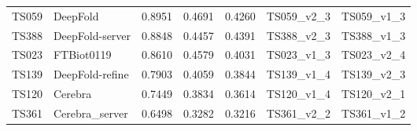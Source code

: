 \begin{table}[ht]
{\begin{tabular}{llrrrll}
TS059 & DeepFold & 0.8951 & 0.4691 & 0.4260 & TS059\_v2\_3 & TS059\_v1\_3 \\ 
TS388 & DeepFold-server & 0.8848 & 0.4457 & 0.4391 & TS388\_v2\_3 & TS388\_v1\_3 \\ 
TS023 & FTBiot0119 & 0.8610 & 0.4579 & 0.4031 & TS023\_v1\_3 & TS023\_v2\_4 \\ 
TS139 & DeepFold-refine & 0.7903 & 0.4059 & 0.3844 & TS139\_v1\_4 & TS139\_v2\_3 \\ 
TS120 & Cerebra & 0.7449 & 0.3834 & 0.3614 & TS120\_v1\_4 & TS120\_v2\_1 \\ 
TS361 & Cerebra\_server & 0.6498 & 0.3282 & 0.3216 & TS361\_v2\_2 & TS361\_v1\_2 \\ 
\bottomrule
\end{tabular}%
}
\end{table}
